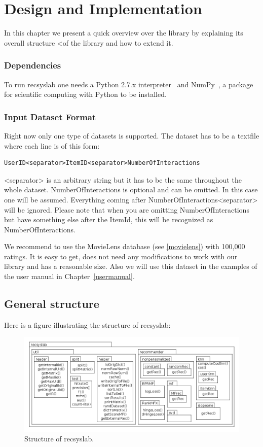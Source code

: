 
\chapter{Design and Implementation}
\label{design}
In this chapter we present a quick overview over the library
by explaining its overall structure <of the library and how to extend it.

\subsection*{Dependencies}
To run recsyslab one needs a Python 2.7.x interpreter~\cite{python} and NumPy~\cite{numpy},
a package for scientific computing with Python to be installed.

\subsection*{Input Dataset Format}
Right now only one type of datasets is supported. The dataset has to be
a textfile where each line is of this form:

\begin{lstlisting}
UserID<separator>ItemID<separator>NumberOfInteractions
\end{lstlisting}

<separator> is an arbitrary string but it has to be the same throughout the whole dataset.
NumberOfInteractions is optional and can be omitted. In this case one will be assumed.
Everything coming after NumberOfInteractions<separator> will be ignored.
Please note that when you are omitting NumberOfInteractions but have something else after
the ItemId, this will be recognized as NumberOfInteractions.

We recommend to use the MovieLens database (see \ref{movielens}) with 100,000 ratings.
It is easy to get, does not need any modifications to work with our library and has a
reasonable size. Also we will use this dataset in the examples of the user manual in 
Chapter~\ref{usermanual}.

%
\pagebreak
\section{General structure}
Here is a figure illustrating the structure of recsyslab:

\begin{figure}[H]
\includegraphics[scale=0.4]{packagediagram.png}
\caption{Structure of recsyslab.}
\end{figure}

